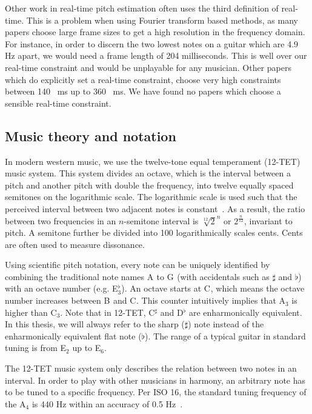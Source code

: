 \documentclass[10pt,twocolumn]{article}
\newcommand{\note}[2]{#1${}_{#2}$}
\newcommand{\notesharp}[2]{#1${}_{#2}^{\sharp}$}
\newcommand{\noteflat}[2]{#1${}_{#2}^{\flat}$}
\begin{document}
Other work in real-time pitch estimation often uses the third definition of real-time. This is a problem when using Fourier transform based methods, as many papers choose large frame sizes to get a high resolution in the frequency domain. For instance, in order to discern the two lowest notes on a guitar which are 4.9 Hz apart, we would need a frame length of 204 milliseconds. This is well over our real-time constraint and would be unplayable for any musician. Other papers which do explicitly set a real-time constraint, choose very high constraints between 140~\cite{sloomboi} ms up to 360~\cite{sloomboi2} ms. We have found no papers which choose a sensible real-time constraint.

\subsection{Music theory and notation}
In modern western music, we use the twelve-tone equal temperament (12-TET) music system. This system divides an octave, which is the interval between a pitch and another pitch with double the frequency, into twelve equally spaced semitones on the logarithmic scale. The logarithmic scale is used such that the perceived interval between two adjacent notes is constant~\cite{perception}. As a result, the ratio between two frequencies in an $n$-semitone interval is $\sqrt[12]{2}^n$ or $2^{\frac{n}{12}}$, invariant to pitch. A semitone further be divided into 100 logarithmically scales cents. Cents are often used to measure dissonance.

Using scientific pitch notation, every note can be uniquely identified by combining the traditional note names \note{A}{} to \note{G}{} (with accidentals such as $\sharp$ and $\flat$) with an octave number (e.g. \noteflat{E}{3}). An octave starts at \note{C}{}, which means the octave number increases between \note{B}{} and \note{C}{}. This counter intuitively implies that \note{A}{3} is higher than \note{C}{3}. Note that in 12-TET, \notesharp{C}{} and \noteflat{D}{} are enharmonically equivalent. In this thesis, we will always refer to the sharp ($\sharp$) note instead of the enharmonically equivalent flat note ($\flat$). %
The range of a typical guitar in standard tuning is from \note{E}{2} up to \note{E}{6}.

The 12-TET music system only describes the relation between two notes in an interval. In order to play with other musicians in harmony, an arbitrary note has to be tuned to a specific frequency. Per ISO 16, the standard tuning frequency of the \note{A}{4} is 440 Hz within an accuracy of 0.5 Hz~\cite{isoa}.
\end{document}
